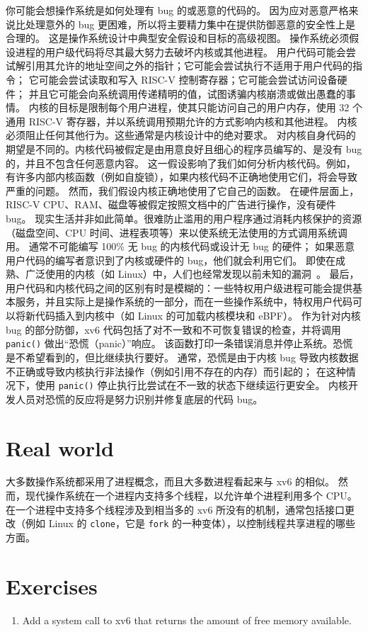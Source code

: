你可能会想操作系统是如何处理有 bug 的或恶意的代码的。
因为应对恶意严格来说比处理意外的 bug 更困难，所以将主要精力集中在提供防御恶意的安全性上是合理的。
这是操作系统设计中典型安全假设和目标的高级视图。
操作系统必须假设进程的用户级代码将尽其最大努力去破坏内核或其他进程。
用户代码可能会尝试解引用其允许的地址空间之外的指针；它可能会尝试执行不适用于用户代码的指令；
它可能会尝试读取和写入 RISC-V 控制寄存器；它可能会尝试访问设备硬件；
并且它可能会向系统调用传递精明的值，试图诱骗内核崩溃或做出愚蠢的事情。
内核的目标是限制每个用户进程，使其只能访问自己的用户内存，使用 32 个通用 RISC-V 寄存器，并以系统调用预期允许的方式影响内核和其他进程。
内核必须阻止任何其他行为。这些通常是内核设计中的绝对要求。
对内核自身代码的期望是不同的。内核代码被假定是由用意良好且细心的程序员编写的、是没有 bug 的，并且不包含任何恶意内容。
这一假设影响了我们如何分析内核代码。例如，有许多内部内核函数（例如自旋锁），如果内核代码不正确地使用它们，将会导致严重的问题。
然而，我们假设内核正确地使用了它自己的函数。
在硬件层面上，RISC-V CPU、RAM、磁盘等被假定按照文档中的广告进行操作，没有硬件 bug。
现实生活并非如此简单。很难防止滥用的用户程序通过消耗内核保护的资源（磁盘空间、CPU 时间、进程表项等）来以使系统无法使用的方式调用系统调用。
通常不可能编写 100\% 无 bug 的内核代码或设计无 bug 的硬件；
如果恶意用户代码的编写者意识到了内核或硬件的 bug，他们就会利用它们。
即使在成熟、广泛使用的内核（如 Linux）中，人们也经常发现以前未知的漏洞~\cite{mitre:cves}。
最后，用户代码和内核代码之间的区别有时是模糊的：一些特权用户级进程可能会提供基本服务，并且实际上是操作系统的一部分，而在一些操作系统中，特权用户代码可以将新代码插入到内核中（如 Linux 的可加载内核模块和 eBPF）。
作为针对内核 bug 的部分防御，xv6 代码包括了对不一致和不可恢复错误的检查，并将调用 {\tt panic()} 做出“恐慌（panic）”响应。
该函数打印一条错误消息并停止系统。恐慌是不希望看到的，但比继续执行要好。
通常，恐慌是由于内核 bug 导致内核数据不正确或导致内核执行非法操作（例如引用不存在的内存）而引起的；
在这种情况下，使用 {\tt panic()} 停止执行比尝试在不一致的状态下继续运行更安全。
内核开发人员对恐慌的反应将是努力识别并修复底层的代码 bug。
\section{Real world}

大多数操作系统都采用了进程概念，而且大多数进程看起来与 xv6 的相似。
然而，现代操作系统在一个进程内支持多个线程，以允许单个进程利用多个 CPU。
在一个进程中支持多个线程涉及到相当多的 xv6 所没有的机制，通常包括接口更改（例如 Linux 的 \lstinline{clone}，它是 \lstinline{fork} 的一种变体），以控制线程共享进程的哪些方面。
\section{Exercises}

\begin{enumerate}

\item Add a system call to xv6
  that returns the amount of free memory available.

\end{enumerate}
